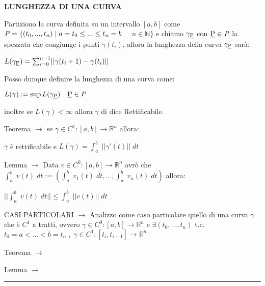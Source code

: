 \documentclass[8pt]{extarticle}
\newenvironment{formulario}
{
\setlength{\columnsep}{3em}
\twocolumn
\lstset{tabsize=3}
\begin{spacing}{1}
\begin{flushleft}
}{
\end{flushleft}
\end{spacing}
}
\newenvironment{tcenter}{
  \par
  \centering
  \setlength{\parskip}{0pt} %
  \noindent
}{
  \par
}
\newenvironment{Descr}
{
	\begin{description}[topsep=0pt,itemsep=0pt,partopsep=0pt, parsep=0pt]
}{
	\end{description}
}
\newenvironment{myParagraph}[1]
{
\begin{tcenter}
\textbf{#1}
\end{tcenter}
}{
\myRule
}
\newcommand{\norma}[1]{\lvert\lvert #1\rvert\rvert}
\newcommand{\R}{\mathbb{R}}
\newcommand{\N}{\mathbb{N}}
\newcommand{\myRule}{\rule{250pt}{0.1pt}}
\newcommand{\ra}{\rightarrow}
\begin{document}
\begin{formulario}
		\begin{myParagraph}{LUNGHEZZA DI UNA CURVA}
Partiziono la curva definita su un intervallo $[a,b]$ come $\text{\textit{P}}=\{(t_0,...,t_n) \;|\; a=t_0 \leq ... \leq t_n=b$ $\quad n\in\N\}$ e chiamo $\gamma_{\text{\underline{P}}}$ con $\text{\underline{P}} \in \text{\textit{P}}$ la spezzata che congiunge i punti $\gamma(t_i)$, allora la lunghezza della curva $\gamma_{\text{\underline{P}}}$ sarà:\\
			\begin{tcenter}
					$L(\gamma_{\text{\underline{P}}})=\sum_{i=0}^{n-1} \norma{\gamma(t_i+1)-\gamma(t_i)}$
			\end{tcenter}
				Posso dunque definire la lunghezza di una curva come:
			\begin{tcenter}
					$L(\gamma):=\sup L(\gamma_{\text{\underline{P}}})\quad\text{\underline{P}}\in P$
			\end{tcenter}
				inoltre se $L(\gamma)<\infty$ allora $\gamma$ di dice Rettificabile.
			\begin{Descr}
				\item[Teorema] $\ra$ se $\gamma\in C^1 :[a,b]\to\R^n$ allora:
				\begin{tcenter}
					$\gamma$ è rettificabile e $L(\gamma)=\int_a^b \; \norma{\gamma'(t)} \; dt$
				\end{tcenter}
				\item[Lemma] $\ra$ Data $v\in C^0:[a,b]\to\R^n$ avrò che $\int_a^b \; v(t)\; dt:=\left(\int_a^b \; v_1(t)\; dt,...,\int_a^b \; v_n(t)\; dt\right)$ allora:
				\begin{tcenter}
					$\norma{\int_a^b \; v(t)\; dt}\leq \int_a^b \; \norma{v(t)}\; dt$
				\end{tcenter}
				\item[CASI PARTICOLARI] $\ra$ Analizzo come caso particolare quello di una curva $\gamma$ che è $C^1$ a tratti, ovvero $\gamma\in C^0:[a,b]\to\R^n$ e $\exists (t_0,...,t_n)$ t.c. $t_0=a<...<b=t_n \; , \; \gamma\in C^1:[t_i,t_{i+1}]\to\R^n$
				\begin{Descr}
					\item[Teorema] $\ra$
					\item[Lemma] $\ra$
				\end{Descr}
			\end{Descr}
 		\end{myParagraph}
		

	
	
	
	\end{formulario}
\end{document}

